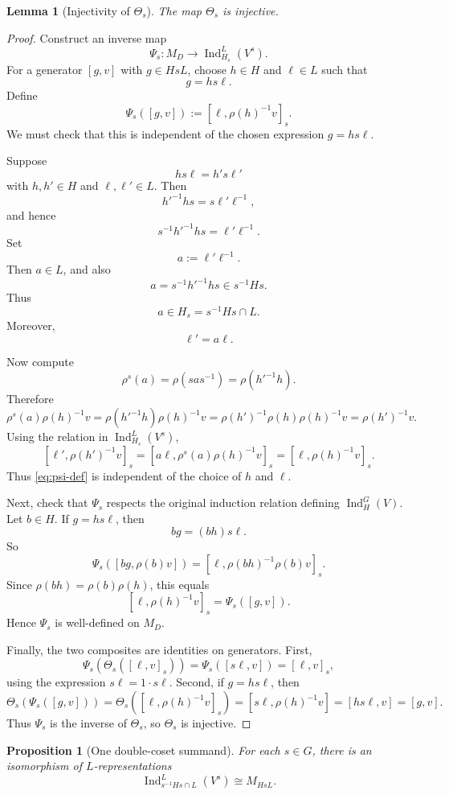 \documentclass[11pt]{article}
\newtheorem{lemma}[theorem]{Lemma}
\newtheorem{proposition}[theorem]{Proposition}
\theoremstyle{definition}
\newcommand{\Ind}{\operatorname{Ind}}
\begin{document}
\begin{lemma}[Injectivity of $\Theta_s$]\label{lem:theta-inj}
The map $\Theta_s$ is injective.
\end{lemma}

\begin{proof}
Construct an inverse map
\[
  \Psi_s : M_D\longrightarrow \Ind_{H_s}^{L}(V^s).
\]
For a generator $[g,v]$ with $g\in HsL$, choose $h\in H$ and $\ell\in L$ such that
\[
  g=hs\ell.
\]
Define
\begin{equation}\label{eq:psi-def}
  \Psi_s([g,v]) := [\ell,\rho(h)^{-1}v]_s.
\end{equation}
We must check that this is independent of the chosen expression $g=hs\ell$.

Suppose
\[
  hs\ell=h's\ell'
\]
with $h,h'\in H$ and $\ell,\ell'\in L$. Then
\[
  h'^{-1}hs=s\ell'\ell^{-1},
\]
and hence
\[
  s^{-1}h'^{-1}hs=\ell'\ell^{-1}.
\]
Set
\[
  a:=\ell'\ell^{-1}.
\]
Then $a\in L$, and also
\[
  a=s^{-1}h'^{-1}hs\in s^{-1}Hs.
\]
Thus
\[
  a\in H_s=s^{-1}Hs\cap L.
\]
Moreover,
\[
  \ell'=a\ell.
\]

Now compute
\[
  \rho^s(a)
  =
  \rho(sas^{-1})
  =
  \rho(h'^{-1}h).
\]
Therefore
\[
  \rho^s(a)\rho(h)^{-1}v
  =
  \rho(h'^{-1}h)\rho(h)^{-1}v
  =
  \rho(h')^{-1}\rho(h)\rho(h)^{-1}v
  =
  \rho(h')^{-1}v.
\]
Using the relation in $\Ind_{H_s}^{L}(V^s)$,
\[
  [\ell',\rho(h')^{-1}v]_s
  =
  [a\ell,\rho^s(a)\rho(h)^{-1}v]_s
  =
  [\ell,\rho(h)^{-1}v]_s.
\]
Thus \eqref{eq:psi-def} is independent of the choice of $h$ and $\ell$.

Next, check that $\Psi_s$ respects the original induction relation defining $\Ind_H^G(V)$. Let $b\in H$. If $g=hs\ell$, then
\[
  bg=(bh)s\ell.
\]
So
\[
  \Psi_s([bg,\rho(b)v])
  =
  [\ell,\rho(bh)^{-1}\rho(b)v]_s.
\]
Since $\rho(bh)=\rho(b)\rho(h)$, this equals
\[
  [\ell,\rho(h)^{-1}v]_s
  =
  \Psi_s([g,v]).
\]
Hence $\Psi_s$ is well-defined on $M_D$.

Finally, the two composites are identities on generators. First,
\[
  \Psi_s(\Theta_s([\ell,v]_s))
  =
  \Psi_s([s\ell,v])
  =
  [\ell,v]_s,
\]
using the expression $s\ell=1\cdot s\ell$. Second, if $g=hs\ell$, then
\[
  \Theta_s(\Psi_s([g,v]))
  =
  \Theta_s([\ell,\rho(h)^{-1}v]_s)
  =
  [s\ell,\rho(h)^{-1}v]
  =
  [hs\ell,v]
  =
  [g,v].
\]
Thus $\Psi_s$ is the inverse of $\Theta_s$, so $\Theta_s$ is injective.
\end{proof}

\begin{proposition}[One double-coset summand]\label{prop:one-summand}
For each $s\in G$, there is an isomorphism of $L$-representations
\[
  \Ind_{s^{-1}Hs\cap L}^{L}(V^s)
  \cong
  M_{HsL}.
\]
\end{proposition}
\end{document}
